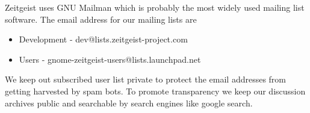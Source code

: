 Zeitgeist uses GNU Mailman which is probably the most widely used mailing list software. The email address for our 
mailing lists are
\begin{itemize}
\item Development - dev@lists.zeitgeist-project.com
\item Users - gnome-zeitgeist-users@lists.launchpad.net
\end{itemize}

We keep out subscribed user list private to protect the email addresses from getting harvested by spam bots. To promote 
transparency we keep our discussion archives public and searchable by search engines like google search.

